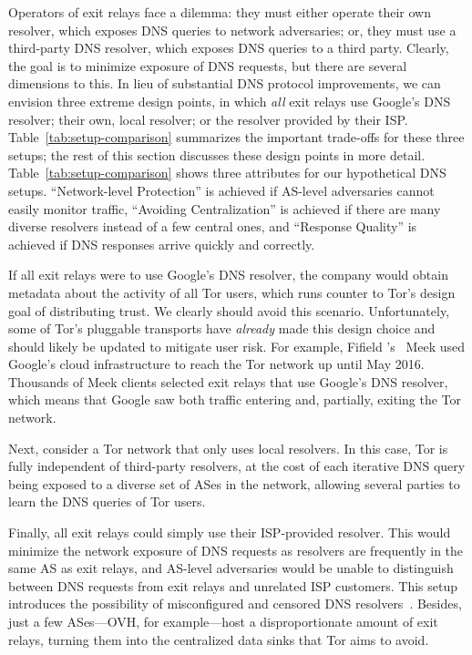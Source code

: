 Operators of exit relays face a dilemma: they must either operate their own
resolver, which exposes DNS queries to network adversaries; or, they
must use a third-party DNS resolver, which exposes DNS queries to a
third party.  Clearly, the goal is to minimize exposure of DNS requests,
but there are several dimensions to this.  In lieu of substantial DNS
protocol improvements, we can envision three extreme design points,
in which \emph{all} exit relays use \first Google's DNS resolver;
\second their own, local resolver; or \third the resolver provided by
their ISP.  Table~\ref{tab:setup-comparison}
summarizes the important trade-offs for these three setups; the rest of
this section discusses these design points in more detail.
Table~\ref{tab:setup-comparison} shows three attributes for our hypothetical DNS
setups.  ``Network-level Protection'' is achieved if AS-level adversaries cannot
easily monitor traffic, ``Avoiding Centralization'' is achieved if there are
many diverse resolvers instead of a few central ones, and ``Response Quality''
is achieved if DNS responses arrive quickly and correctly.

If all exit relays were to use Google's DNS resolver, the company would
obtain metadata about the activity of all Tor users, which runs counter to
Tor's design goal of distributing trust.  We clearly should avoid this
scenario. Unfortunately, some of Tor's pluggable transports
have {\em already} made this design choice and should likely be updated
to mitigate user risk.  For example, Fifield \ea's~\cite{Fifield2015a}
Meek used Google's cloud infrastructure
to reach the Tor network up until May 2016.
Thousands of Meek clients
selected exit relays that use Google's DNS resolver, which means that Google
saw both traffic entering and, partially, exiting the Tor network.

Next, consider a Tor network that only uses local resolvers.  In this
case, Tor is fully independent of third-party resolvers, at the cost of
each iterative DNS query being exposed to a diverse set of ASes in the
network, allowing several parties to learn the DNS queries of Tor users.

Finally, all exit
relays could simply use their ISP-provided resolver.  This would minimize the
network exposure of DNS requests as resolvers are frequently in the same AS as
exit relays, and AS-level adversaries would be unable to distinguish
between DNS requests from exit relays and unrelated ISP customers.  This
setup introduces the possibility of misconfigured and censored DNS
resolvers~\cite[\S~4.1]{Winter2014b}.  Besides, just a few ASes---OVH, for
example---host a disproportionate amount of exit relays, turning them into the
centralized data sinks that Tor aims to avoid.


